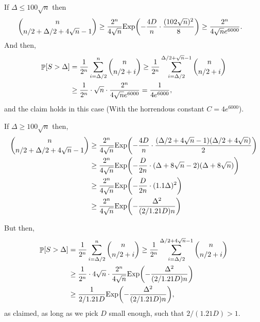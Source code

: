 {{      If $\Delta \leq 100\sqrt{n}$ then
      \begin{align*}
          \binom{n}{n/2 + \Delta/2 + 4\sqrt{n} - 1} &\geq
          \frac{2^n}{4\sqrt{n}} \Exp \pth{ - \frac{4D}{n} \cdot
             \frac{(102\sqrt{n} )^2}{8} } \geq \frac{2^n}{4\sqrt{n}
             e^{6000}}.
      \end{align*}
      And then,
      \begin{align*}
          \Prob{S > \Delta}%
          &=%
          \frac{1}{2^n}\sum_{i=\Delta/2}^n \binom{n}{n/2 + i} \geq
          \frac{1}{2^n}\sum_{i=\Delta/2}^{\Delta/2+\sqrt{n} -1}
          \binom{n}{n/2 + i}%
          \\&%
          \geq%
          \frac{1}{2^n} \cdot \sqrt{n} \cdot \frac{2^n}{4\sqrt{n}
             e^{6000}} = \frac{1}{4e^{6000}},
      \end{align*}
      and the claim holds in this case (With the horrendous constant
      $C = 4e^{6000}$).
      
      If $\Delta \geq 100\sqrt{n}$ then,
      \begin{align*}
          \binom{n}{n/2 + \Delta/2 + 4\sqrt{n} - 1} &\geq%
          \frac{2^n}{4\sqrt{n}} \Exp \pth{ - \frac{4D}{n} \cdot
             \frac{(\Delta/2 + 4\sqrt{n}
                -1)(\Delta/2 + 4 \sqrt{n})}{2} }\\
          &\geq%
          \frac{2^n}{4\sqrt{n}} \Exp \pth{ - \frac{D}{2n} \cdot
             (\Delta + 8\sqrt{n}
             -2)(\Delta + 8 \sqrt{n}) }\\
          &\geq%
          \frac{2^n}{4\sqrt{n}} \Exp \pth{ -
             \frac{D}{2n} \cdot (1.1\Delta)^2 }\\
          &\geq%
          \frac{2^n}{4\sqrt{n}} \Exp \pth{ -
             \frac{\Delta^2}{(2/1.21D)n} }\\
      \end{align*}
      
      But then,
      \begin{align*}
          \Prob{S > \Delta}%
          &=%
          \frac{1}{2^n}\sum_{i=\Delta/2}^n \binom{n}{n/2 + i} \geq
          \frac{1}{2^n}\sum_{i=\Delta/2}^{\Delta/2+4\sqrt{n} -1}
          \binom{n}{n/2
             + i} \\
          &\geq%
          \frac{1}{2^n} \cdot 4 \sqrt{n} \cdot \frac{2^n}{4\sqrt{n}}
          \Exp \pth{ -
             \frac{\Delta^2}{(2/1.21D)n} }\\
          &\geq \frac{1}{2/1.21D} \Exp \pth{ -
             \frac{\Delta^2}{(2/1.21D)n} },
      \end{align*}
      as claimed, as long as we pick $D$ small enough, such that
      $2/(1.21D) > 1$.%
   }%
}


